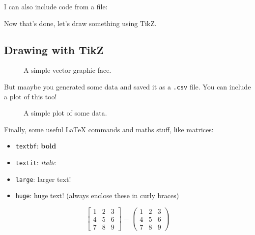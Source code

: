 \documentclass[12pt,twoside]{article}
\begin{document}
I can also include code from a file:


Now that's done, let's draw something using TikZ.

\subsection{Drawing with TikZ}

\begin{figure}[H]
    \centering
    \caption{A simple vector graphic face.}
    \label{fig:tikz_2d}
\end{figure}

But maaybe you generated some data and saved it as a \texttt{.csv} file. You can
include a plot of this too!

\begin{figure}[H]
    \centering
    \caption{A simple plot of some data.}
    \label{fig:tikz_plot}
\end{figure}

Finally, some useful LaTeX commands and maths stuff, like matrices:
\begin{itemize}
    \item \texttt{textbf}: \textbf{bold}
    \item \texttt{textit}: \textit{italic}
    \item \texttt{large}: {\large{larger text!}}
    \item \texttt{huge}: {\huge{huge text!}} (always enclose
    these in curly braces)
\end{itemize}

\begin{equation}
    \begin{bmatrix}
        1 & 2 & 3 \\
        4 & 5 & 6 \\
        7 & 8 & 9
    \end{bmatrix}=
    \begin{pmatrix}
        1 & 2 & 3 \\
        4 & 5 & 6 \\
        7 & 8 & 9
    \end{pmatrix}
\end{equation}
\end{document}
